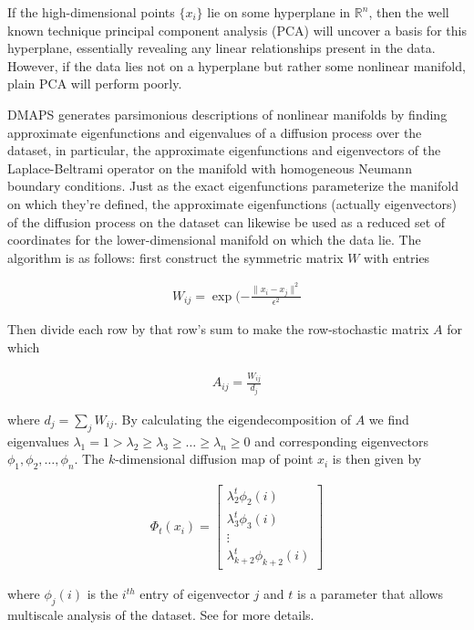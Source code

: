 \documentclass{article}
\begin{document}
If the high-dimensional points $\{ x_i \}$ lie on some hyperplane in
$\mathbb{R}^n$, then the well known technique principal component
analysis (PCA) will uncover a basis for this hyperplane, essentially
revealing any linear relationships present in the data. However, if
the data lies not on a hyperplane but rather some nonlinear manifold,
plain PCA will perform poorly. 

DMAPS generates parsimonious descriptions of nonlinear manifolds by
finding approximate eigenfunctions and eigenvalues of a diffusion
process over the dataset, in particular, the approximate
eigenfunctions and eigenvectors of the Laplace-Beltrami operator on
the manifold with homogeneous Neumann boundary conditions. Just as the
exact eigenfunctions parameterize the manifold on which they're
defined, the approximate eigenfunctions (actually eigenvectors) of the
diffusion process on the dataset can likewise be used as a reduced set
of coordinates for the lower-dimensional manifold on which the data
lie. The algorithm is as follows: first construct the symmetric matrix
$W$ with entries

\begin{align*}
  W_{ij} = \exp(-\frac{\| x_i - x_j \|^2}{\epsilon^2}
\end{align*}

Then divide each row by that row's sum to make the row-stochastic
matrix $A$ for which

\begin{align*}
  A_{ij} = \frac{W_{ij}}{d_j}
\end{align*}

where $d_j = \sum_j W_{ij}$. By calculating the eigendecomposition of
$A$ we find eigenvalues
$\lambda_1 = 1 > \lambda_2 \ge \lambda_3 \ge \hdots \ge \lambda_n \ge
0$ and corresponding eigenvectors $\phi_1, \phi_2, \hdots,
\phi_n$. The $k$-dimensional diffusion map of point $x_i$ is then
given by

\begin{align*}
  \Phi_t (x_i) = \begin{bmatrix} \lambda_2^t \phi_2(i) \\ \lambda_3^t
    \phi_3(i) \\ \vdots \\ \lambda_{k+2}^t \phi_{k+2}(i) \end{bmatrix}
\end{align*}

where $\phi_j(i)$ is the $i^{th}$ entry of eigenvector $j$ and $t$ is
a parameter that allows multiscale analysis of the dataset. See
\cite{dmaps} \cite{nadler} for more details.
\end{document}
